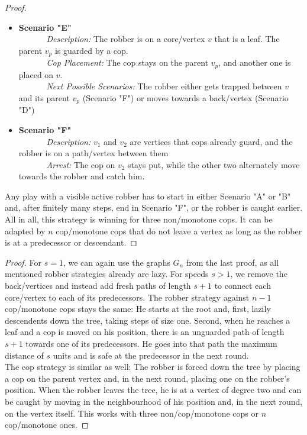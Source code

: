 \begin{proof}
\begin{itemize}
           \item \textbf{Scenario "E"} \\
           \textit{Description:} The robber is on a core\-/vertex $v$ that is a leaf. The parent $v_p$ is guarded by a cop.\\
           \textit{Cop Placement:} The cop stays on the parent $v_p$, and another one is placed on $v$. \\
           \textit{Next Possible Scenarios:} The robber either gets trapped between $v$ and its parent $v_p$ (Scenario "F") or moves towards a back\-/vertex (Scenario "D") \\
           \item \textbf{Scenario "F"} \\
           \textit{Description:} $v_1$ and $v_2$ are vertices that cops already guard, and the robber is on a path\-/vertex between them\\
           \textit{Arrest:} The cop on $v_2$ stays put, while the other two alternately move towards the robber and catch him. 
       \end{itemize}
   Any play with a visible active robber has to start in either Scenario "A" or "B" and, after finitely many steps, end in Scenario "F", or the robber is caught earlier. All in all, this strategy is winning for three non\-/monotone cops. It can be adapted by $n$ cop\-/monotone cops that do not leave a vertex as long as the robber is at a predecessor or descendant.
\end{proof}




\TheoremVisLazyCopmonotonicity*
\begin{proof}
    For $s=1$, we can again use the graphs $G_n$ from the last proof, as all mentioned robber strategies already are lazy. For speeds $s>1$, we remove the back\-/vertices and instead add fresh paths of length $s+1$ to connect each core\-/vertex to each of its predecessors. The robber strategy against $n-1$ cop\-/monotone cops stays the same: He starts at the root and, first, lazily descendents down the tree, taking steps of size one. Second, when he reaches a leaf and a cop is moved on his position, there is an unguarded path of length $s+1$ towards one of its predecessors. He goes into that path the maximum distance of $s$ units and is safe at the predecessor in the next round. \\
    The cop strategy is similar as well: The robber is forced down the tree by placing a cop on the parent vertex and, in the next round, placing one on the robber's position. When the robber leaves the tree, he is at a vertex of degree two and can be caught by moving in the neighbourhood of his position and, in the next round, on the vertex itself. This works with three non\-/cop\-/monotone cops or $n$ cop\-/monotone ones.
\end{proof}

